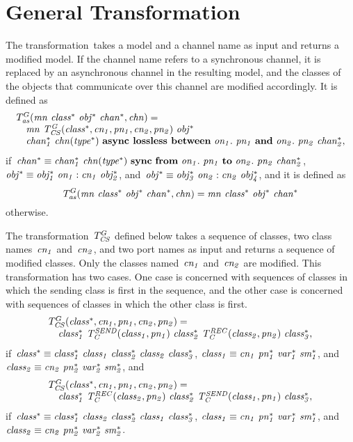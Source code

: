 \section{General Transformation}
The transformation~\TGen takes a model and a channel name as input and returns a modified model.
If the channel name refers to a synchronous channel, it is replaced by an asynchronous channel in the resulting model, and the classes of the objects that communicate over this channel are modified accordingly.
It is defined as
%
\[
\begin{array}{l}
T^G_{\it{as}}(\it{mn}~\it{class^*}~\it{obj^*}~\it{chan^*}, \it{chn}) = \\
\quad \it{mn}
~ T^G_{\it{CS}}(\it{class^*}, \it{cn_1}, \it{pn_1}, \it{cn_2}, \it{pn_2})
~ \it{obj^*} \\
\quad \it{chan_1^*}~\it{chn}(\it{type^*})~\textbf{async lossless between}~\it{on_1}.~\it{pn_1}~\textbf{and}~\it{on_2}.~\it{pn_2}~\it{chan_2^*}, \\
\end{array}
\]
if~$\it{chan^*} \equiv \it{chan_1^*}~\it{chn}(\it{type^*})~\textbf{sync}~\textbf{from}~\it{on_1}.~\it{pn_1}~\textbf{to}~\it{on_2}.~\it{pn_2}~\it{chan_2^*}$,
$\it{obj^*} \equiv \it{obj_1^*}~\it{on_1}:\it{cn_1}~\it{obj_2^*}$, and~$\it{obj^*} \equiv \it{obj_3^*}~\it{on_2}:\it{cn_2}~\it{obj_4^*}$,
and it is defined as
%
\[
T^G_{\it{as}}(\it{mn}~\it{class^*}~\it{obj^*}~\it{chan^*}, \it{chn}) = \it{mn}~\it{class^*}~\it{obj^*}~\it{chan^*}
\]
%
otherwise.

The transformation~$T^G_{\it{CS}}$ defined below takes a sequence of classes, two class names~$\it{cn_1}$ and~$\it{cn_2}$, and two port names as input and returns a sequence of modified classes.
Only the classes named~$\it{cn_1}$ and~$\it{cn_2}$ are modified.
This transformation has two cases.
One case is concerned with sequences of classes in which the sending class is first in the sequence, and the other case is concerned with sequences of classes in which the other class is first.
%
\[
\begin{array}{l}
T^G_{\it{CS}}(\it{class^*}, \it{cn_1}, \it{pn_1}, \it{cn_2}, \it{pn_2}) = \\
\quad \it{class_1^*}~T_{\it{C}}^{\it{SEND}}(\it{class_1}, \it{pn_1})~\it{class_2^*}~T_{\it{C}}^{\it{REC}}(\it{class_2}, \it{pn_2})~\it{class_3^*},
\end{array}
\]
if~$\it{class^*} \equiv \it{class_1^*}~\it{class_1}~\it{class_2^*}~\it{class_2}~\it{class_3^*}$,
$\it{class_1} \equiv \it{cn_1}~\it{pn_1^*}~\it{var_1^*}~\it{sm_1^*}$,
and~$\it{class_2} \equiv \it{cn_2}~\it{pn_2^*}~\it{var_2^*}~\it{sm_2^*}$, and
%
\[
\begin{array}{l}
T^G_{\it{CS}}(\it{class^*}, \it{cn_1}, \it{pn_1}, \it{cn_2}, \it{pn_2}) = \\
\quad \it{class_1^*}~T_{\it{C}}^{\it{REC}}(\it{class_2}, \it{pn_2})~\it{class_2^*}~T_{\it{C}}^{\it{SEND}}(\it{class_1}, \it{pn_1})~\it{class_3^*},
\end{array}
\]
if~$\it{class^*} \equiv \it{class_1^*}~\it{class_2}~\it{class_2^*}~\it{class_1}~\it{class_3^*}$,
$\it{class_1} \equiv \it{cn_1}~\it{pn_1^*}~\it{var_1^*}~\it{sm_1^*}$,
and~$\it{class_2} \equiv \it{cn_2}~\it{pn_2^*}~\it{var_2^*}~\it{sm_2^*}$.


